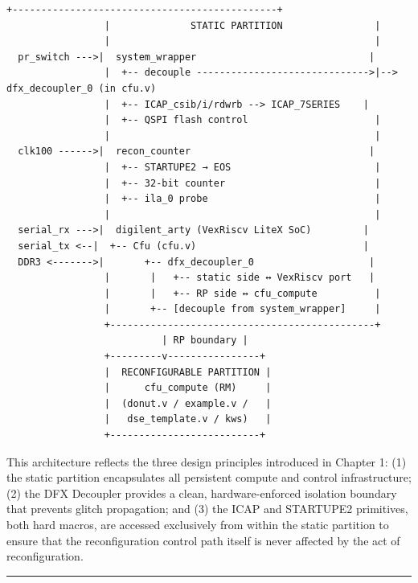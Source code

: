 \begin{lstlisting}[style=mystyle]
                 +----------------------------------------------+
                 |              STATIC PARTITION                |
                 |                                              |
  pr_switch --->|  system_wrapper                              |
                 |  +-- decouple ------------------------------>|--> dfx_decoupler_0 (in cfu.v)
                 |  +-- ICAP_csib/i/rdwrb --> ICAP_7SERIES    |
                 |  +-- QSPI flash control                      |
                 |                                              |
  clk100 ------>|  recon_counter                               |
                 |  +-- STARTUPE2 → EOS                         |
                 |  +-- 32-bit counter                          |
                 |  +-- ila_0 probe                             |
                 |                                              |
  serial_rx --->|  digilent_arty (VexRiscv LiteX SoC)         |
  serial_tx <--|  +-- Cfu (cfu.v)                             |
  DDR3 <------->|       +-- dfx_decoupler_0                    |
                 |       |   +-- static side ↔ VexRiscv port   |
                 |       |   +-- RP side ↔ cfu_compute          |
                 |       +-- [decouple from system_wrapper]     |
                 +----------------------------------------------+
                           | RP boundary |
                 +---------v----------------+
                 |  RECONFIGURABLE PARTITION |
                 |      cfu_compute (RM)     |
                 |  (donut.v / example.v /   |
                 |   dse_template.v / kws)   |
                 +--------------------------+
\end{lstlisting}

This architecture reflects the three design principles introduced in Chapter 1: (1) the static partition encapsulates all persistent compute and control infrastructure; (2) the DFX Decoupler provides a clean, hardware-enforced isolation boundary that prevents glitch propagation; and (3) the ICAP and STARTUPE2 primitives, both hard macros, are accessed exclusively from within the static partition to ensure that the reconfiguration control path itself is never affected by the act of reconfiguration.

\vspace{0.4em}\hrule\vspace{0.4em}
